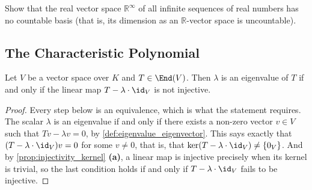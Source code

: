 \begin{exercise}
  \label{exc:uncountable_dimension_sequence_space}
  Show that the real vector space $\mathbb{R}^\infty$ of all infinite sequences of real numbers has no countable basis (that is, its dimension as an $\mathbb{R}$-vector space is uncountable).
\end{exercise}

\subsection{The Characteristic Polynomial}

\begin{proposition}\label{prop:eigen_injective}
  Let $V$ be a vector space over $K$ and $T \in \End(V)$. Then $\lambda$ is an eigenvalue of $T$ if and only if the linear map $T - \lambda \cdot \id_V$ is not injective.
\end{proposition}

\begin{proof}
  Every step below is an equivalence, which is what the statement requires. The scalar $\lambda$ is an eigenvalue if and only if there exists a non-zero vector $v \in V$ such that $Tv - \lambda v = 0$, by \cref{def:eigenvalue_eigenvector}. This says exactly that $(T - \lambda \cdot \id_V)v = 0$ for some $v \ne 0$, that is, that $\ker(T - \lambda \cdot \id_V) \ne \{0_V\}$. And by \cref{prop:injectivity_kernel} \textbf{(a)}, a linear map is injective precisely when its kernel is trivial, so the last condition holds if and only if $T - \lambda \cdot \id_V$ fails to be injective.
\end{proof}

